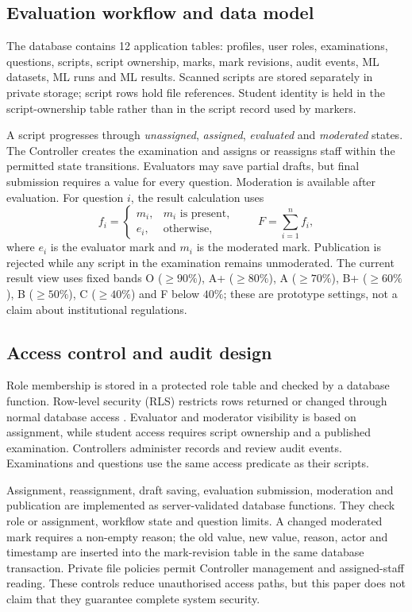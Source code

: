 \documentclass[conference]{IEEEtran}
\begin{document}
\subsection{Evaluation workflow and data model}
The database contains 12 application tables: profiles, user roles, examinations, questions, scripts, script ownership, marks, mark revisions, audit events, ML datasets, ML runs and ML results. Scanned scripts are stored separately in private storage; script rows hold file references. Student identity is held in the script-ownership table rather than in the script record used by markers.

A script progresses through \emph{unassigned}, \emph{assigned}, \emph{evaluated} and \emph{moderated} states. The Controller creates the examination and assigns or reassigns staff within the permitted state transitions. Evaluators may save partial drafts, but final submission requires a value for every question. Moderation is available after evaluation. For question $i$, the result calculation uses
\begin{equation}
f_i = \begin{cases}
m_i, & m_i \text{ is present},\\
e_i, & \text{otherwise},
\end{cases}
\qquad F=\sum_{i=1}^{n}f_i ,
\end{equation}
where $e_i$ is the evaluator mark and $m_i$ is the moderated mark. Publication is rejected while any script in the examination remains unmoderated. The current result view uses fixed bands O ($\geq90\%$), A+ ($\geq80\%$), A ($\geq70\%$), B+ ($\geq60\%$), B ($\geq50\%$), C ($\geq40\%$) and F below $40\%$; these are prototype settings, not a claim about institutional regulations.

\subsection{Access control and audit design}
Role membership is stored in a protected role table and checked by a database function. Row-level security (RLS) restricts rows returned or changed through normal database access \cite{postgresqlRLS}. Evaluator and moderator visibility is based on assignment, while student access requires script ownership and a published examination. Controllers administer records and review audit events. Examinations and questions use the same access predicate as their scripts.

Assignment, reassignment, draft saving, evaluation submission, moderation and publication are implemented as server-validated database functions. They check role or assignment, workflow state and question limits. A changed moderated mark requires a non-empty reason; the old value, new value, reason, actor and timestamp are inserted into the mark-revision table in the same database transaction. Private file policies permit Controller management and assigned-staff reading. These controls reduce unauthorised access paths, but this paper does not claim that they guarantee complete system security.
\end{document}
